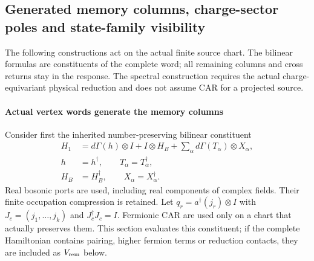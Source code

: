 \documentclass[12pt,a4paper]{article}
\begin{document}
\subsection{Generated memory columns, charge-sector poles and state-family visibility}
\label{p4:sec:v2168-charged-memory-spectrum}
The following constructions act on the actual finite source chart.
The bilinear formulas are constituents of the complete word; all remaining
columns and cross returns stay in the response. The spectral construction
requires the actual charge-equivariant physical reduction and does not
assume CAR for a projected source.


\paragraph{Actual vertex words generate the memory columns}
Consider first the inherited number-preserving bilinear constituent
\[
\begin{aligned}
 H_1 &= d\Gamma(h)\otimes I+I\otimes H_B
       +\sum_\alpha d\Gamma(T_\alpha)\otimes X_\alpha,\\
 h &= h^\dagger,\qquad T_\alpha=T_\alpha^\dagger,\\
 H_B &= H_B^\dagger,\qquad X_\alpha=X_\alpha^\dagger.
\end{aligned}
\]
Real bosonic ports are used, including real components of complex fields.
Their finite occupation compression is retained. Let
$q_r=a^\dagger(j_r)\otimes I$ with $J_c=(j_1,\ldots,j_k)$ and
$J_c^\dagger J_c=I$. Fermionic CAR are used only on a chart that actually
preserves them. This section evaluates this constituent; if the complete
Hamiltonian contains pairing, higher fermion terms or reduction contacts,
they are included as $V_{\rm rem}$ below.
\end{document}
